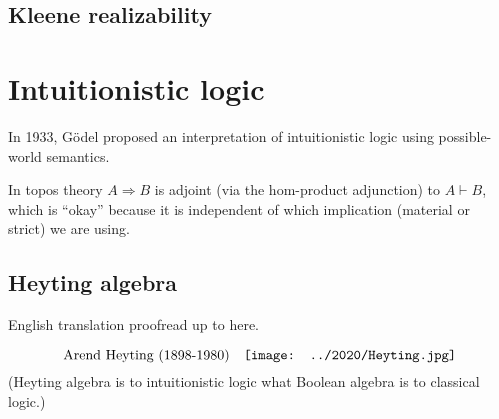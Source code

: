\subsection{Kleene realizability}

\underconst

\section{Intuitionistic logic}

In 1933, G\"{o}del proposed an interpretation of intuitionistic logic using possible-world semantics.

In topos theory $A \Rightarrow B$ is adjoint (via the hom-product adjunction) to $A \vdash B$, which is ``okay'' because it is independent of which implication (material or strict) we are using.

\subsection{Heyting algebra}

{\color{red} English translation proofread up to here.}

\begin{equation}
\mbox{Arend Heyting (1898-1980)} \quad 
\vcenter{\hbox{\texttt{[image: ../2020/Heyting.jpg]}}}
\end{equation}
(Heyting algebra is to intuitionistic logic what Boolean algebra is to classical logic.)

